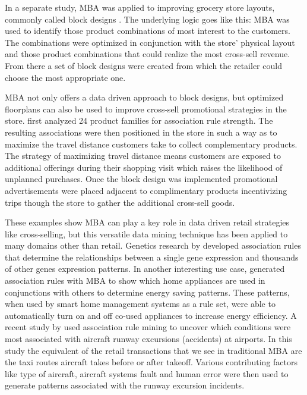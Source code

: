 \documentclass[../article.tex, 12pt]{subfiles}
\begin{document}
\begin{multicols*}{2}
\par
In a separate study, MBA was applied to improving grocery store layouts, commonly called block designs \citep{ozgormus2020data}. The underlying logic goes like this: MBA was used to identify those product combinations of most interest to the customers. The combinations were optimized in conjunction with the store' physical layout and those product combinations that could realize the most cross-sell revenue. From there a set of block designs were created from which the retailer could choose the most appropriate one.

\par
MBA not only offers a data driven approach to block designs, but optimized floorplans can also be used to improve cross-sell promotional strategies in the store. \cite{bermudez2016layout} first analyzed 24 product families for association rule strength. The resulting associations were then positioned in the store in such a way as to maximize the travel distance customers take to collect complementary products. The strategy of maximizing travel distance means customers are exposed to additional offerings during their shopping visit which raises the likelihood of unplanned purchases. Once the block design was implemented promotional advertisements were placed adjacent to complimentary products incentivizing trips though the store to gather the additional cross-sell goods.

\par
These examples show MBA can play a key role in data driven retail strategies like cross-selling, but this versatile data mining technique has been applied to many domains other than retail. Genetics research by \cite{anandhavalli2010association} developed association rules that determine the relationships between a single gene expression and thousands of other genes expression patterns. In another interesting use case, \cite{bhagwandin2017association} generated association rules with MBA to show which home appliances are used in conjunctions with others to determine energy saving patterns. These patterns, when used by smart home management systems as a rule set, were able to automatically turn on and off co-used appliances to increase energy efficiency. A recent study by \cite{natalia2020apriori} used association rule mining to uncover which conditions were most associated with aircraft runway excursions (accidents) at airports. In this study the equivalent of the retail transactions that we see in traditional MBA are the taxi routes aircraft takes before or after takeoff. Various contributing factors like type of aircraft, aircraft systems fault and human error were then used to generate patterns associated with the runway excursion incidents. 


\end{multicols*}
\end{document}
